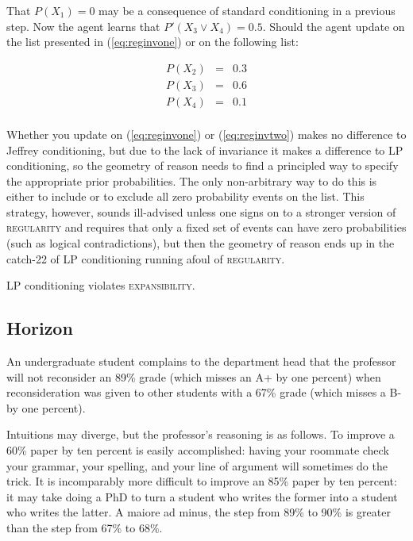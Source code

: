 \documentclass[smallextended]{svjour3}       %
\begin{document}
That $P(X_{1})=0$ may be a consequence of standard conditioning in a
previous step. Now the agent learns that $P'(X_{3}\vee{}X_{4})=0.5$.
Should the agent update on the list presented in (\ref{eq:reginvone})
or on the following list:

\begin{equation}
  \label{eq:reginvtwo}
  \begin{array}{rcl}
  P(X_{2})&=&0.3\\
  P(X_{3})&=&0.6\\
  P(X_{4})&=&0.1\\
\end{array}
\end{equation}

Whether you update on (\ref{eq:reginvone}) or (\ref{eq:reginvtwo})
makes no difference to Jeffrey conditioning, but due to the lack of
invariance it makes a difference to LP conditioning, so the geometry
of reason needs to find a principled way to specify the appropriate
prior probabilities. The only non-arbitrary way to do this is either
to include or to exclude all zero probability events on the list. This
strategy, however, sounds ill-advised unless one signs on to a
stronger version of \textsc{regularity} and requires that only a fixed
set of events can have zero probabilities (such as logical
contradictions), but then the geometry of reason ends up in the
catch-22 of LP conditioning running afoul of \textsc{regularity}.

LP conditioning violates \textsc{expansibility}.

\subsection{Horizon}
\label{Horizon}

\begin{quotex}
  \label{ex:complaint} An
  undergraduate student complains to the department head that the
  professor will not reconsider an 89\% grade (which misses an A+ by
  one percent) when reconsideration was given to other students with a
  67\% grade (which misses a B- by one percent).
\end{quotex}

Intuitions may diverge, but the professor's reasoning is as follows.
To improve a 60\% paper by ten percent is easily accomplished: having
your roommate check your grammar, your spelling, and your line of
argument will sometimes do the trick. It is incomparably more
difficult to improve an 85\% paper by ten percent: it may take doing a
PhD to turn a student who writes the former into a student who writes
the latter. A maiore ad minus, the step from 89\% to 90\% is greater
than the step from 67\% to 68\%.
\end{document}

